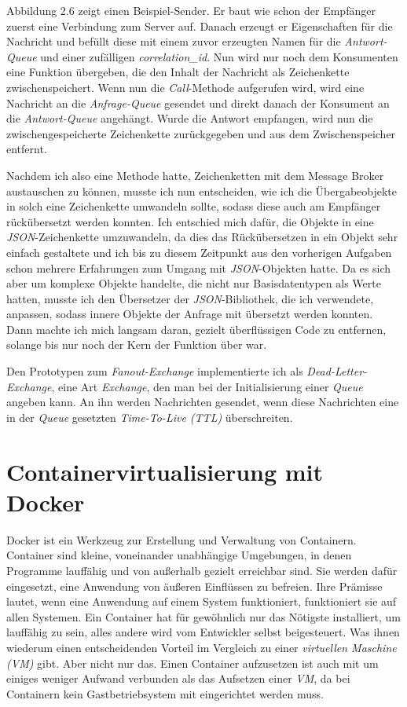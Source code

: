 \documentclass[12pt,a4paper]{scrartcl}
\begin{document}
Abbildung 2.6 zeigt einen Beispiel-Sender. Er baut wie schon der Empfänger zuerst eine Verbindung zum Server auf. Danach erzeugt er Eigenschaften für die Nachricht und befüllt diese mit einem zuvor erzeugten Namen für die \emph{Antwort-Queue} und einer zufälligen \emph{correlation\_id}. Nun wird nur noch dem Konsumenten eine Funktion übergeben, die den Inhalt der Nachricht als Zeichenkette zwischenspeichert. Wenn nun die \emph{Call}-Methode aufgerufen wird, wird eine Nachricht an die \emph{Anfrage-Queue} gesendet und direkt danach der Konsument an die \emph{Antwort-Queue} angehängt. Wurde die Antwort empfangen, wird nun die zwischengespeicherte Zeichenkette zurückgegeben und aus dem Zwischenspeicher entfernt.

Nachdem ich also eine Methode hatte, Zeichenketten mit dem Message Broker austauschen zu können, musste ich nun entscheiden, wie ich die Übergabeobjekte in solch eine Zeichenkette umwandeln sollte, sodass diese auch am Empfänger rückübersetzt werden konnten.
Ich entschied mich dafür, die Objekte in eine \emph{\Gls{JSON}}-Zeichenkette umzuwandeln, da dies das Rückübersetzen in ein Objekt sehr einfach gestaltete und ich bis zu diesem Zeitpunkt aus den vorherigen Aufgaben schon mehrere Erfahrungen zum Umgang mit \emph{JSON}-Objekten hatte. 
Da es sich aber um komplexe Objekte handelte, die nicht nur Basisdatentypen als Werte hatten, musste ich den Übersetzer der \emph{JSON}-Bibliothek, die ich verwendete, anpassen, sodass innere Objekte der Anfrage mit übersetzt werden konnten. 
Dann machte ich mich langsam daran, gezielt überflüssigen Code zu entfernen, solange bis nur noch der Kern der Funktion über war.

Den Prototypen zum \emph{Fanout-Exchange} implementierte ich als \emph{Dead-Letter-Exchange}\cite{rabDlx}, eine Art \emph{Exchange}, den man bei der Initialisierung einer \emph{Queue} angeben kann. An ihn werden Nachrichten gesendet, wenn diese Nachrichten eine in der \emph{Queue} gesetzten \emph{Time-To-Live (TTL)}\cite{rabTtl} überschreiten.


\newpage
\section{Containervirtualisierung mit Docker} \label{docker}
Docker\cite{docker} ist ein Werkzeug zur Erstellung und Verwaltung von Containern. 
Container sind kleine, voneinander unabhängige Umgebungen, in denen Programme lauffähig und von außerhalb gezielt erreichbar sind. Sie werden dafür eingesetzt, eine Anwendung von äußeren Einflüssen zu befreien. Ihre Prämisse lautet, wenn eine Anwendung auf einem System funktioniert, funktioniert sie auf allen Systemen. Ein Container hat für gewöhnlich nur das Nötigste installiert, um lauffähig zu sein, alles andere wird vom Entwickler selbst beigesteuert. Was ihnen wiederum einen entscheidenden Vorteil im Vergleich zu einer \emph{virtuellen Maschine (VM)} gibt. Aber nicht nur das. Einen Container aufzusetzen ist auch mit um einiges weniger Aufwand verbunden als das Aufsetzen einer \emph{VM}, da bei Containern kein Gastbetriebsystem mit eingerichtet werden muss. 
\end{document}
